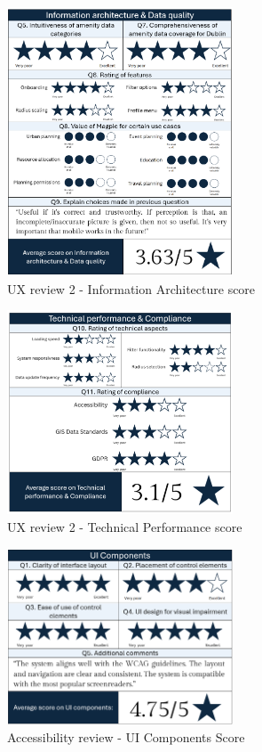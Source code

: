 \begin{figure}[htbp]
    \centering
    \includegraphics[width=0.6\textwidth]{images/ux-survey2-data.png}
    \caption{UX review 2 - Information Architecture score}
    \label{fig:ux2datascore}
\end{figure}

\begin{figure}[htbp]
    \centering
    \includegraphics[width=0.6\textwidth]{images/ux-survey2-technical.png}
    \caption{UX review 2 - Technical Performance score}
    \label{fig:ux2technicalscore}
\end{figure}

\begin{figure}[htbp]
    \centering
    \includegraphics[width=0.6\textwidth]{images/accessb-survey-components.png}
    \caption{Accessibility review - UI Components Score}
    \label{fig:accessbuiscore}
\end{figure}

